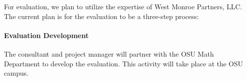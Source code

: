 




For evaluation, we plan to utilize the expertise of West Monroe
Partners, LLC. The current plan is for the evaluation to be a three-step process:
\paragraph{Evaluation Development} The consultant and project
  manager will partner with the OSU Math Department to develop the
  evaluation.  This activity will take place at the OSU campus.
